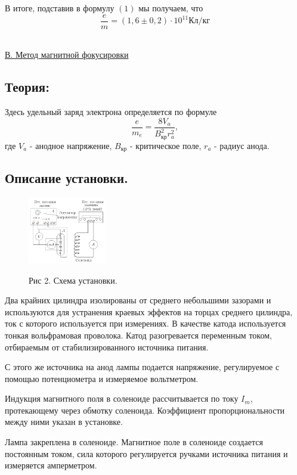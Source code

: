 \documentclass{article}
\begin{document}
В итоге, подставив в формулу $(1)$ мы получаем, что 
\[\dfrac{e}{m} = \left(1,6 \pm 0,2\right) \cdot 10^{11} \text{Кл}/\text{кг}\]
\\
\begin{center}
    \underline{\large {В. Метод магнитной фокусировки}}
\end{center}

\subsection*{Теория:}
Здесь удельный заряд электрона определяется по формуле
\begin{equation}
\dfrac{e}{m_e} = \dfrac{8V_a}{B_{\text{кр}}^2r_a^2},
\end{equation}
где $V_a$ - анодное напряжение, $B_{\text{кр}}$ - критическое поле, $r_a$ - радиус анода.
\subsection*{Описание установки.}
\begin{figure}
  \begin{center}
    \includegraphics[width = 0.3\textwidth]{images/image6.png}
  \end{center}
  Рис 2. Схема установки.
\end{figure}
Два крайних цилиндра изолированы от среднего небольшими зазорами и используются для устранения краевых эффектов на торцах среднего цилиндра, ток с которого используется при измерениях. В качестве катода используется тонкая вольфрамовая проволока. Катод разогревается переменным током, отбираемым от стабилизированного источника питания. 

С этого же источника на анод лампы подается напряжение, регулируемое с помощью потенциометра и измеряемое вольтметром.

Индукция магнитного поля в соленоиде рассчитывается по току $I_m$, протекающему через обмотку соленоида. Коэффициент пропорциональности между ними указан в установке.

Лампа закреплена в соленоиде. Магнитное поле в соленоиде создается постоянным током, сила которого регулируется ручками источника питания и измеряется амперметром.
\end{document}
